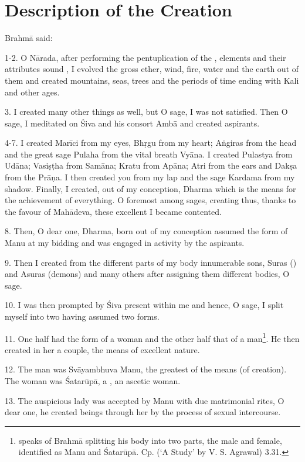 \chapter{Description of the Creation}

Brahmā said:

1-2. O Nārada, after performing the pentuplication of the , elements
and their attributes sound \etc, I evolved the gross ether, wind, fire, water
and the earth out of them and created mountains, seas, trees \etc and
the periods of time ending with Kali and other ages.

3. I created many other things as well, but O sage, I was not satisfied. Then
O sage, I meditated on Śiva and his consort Ambā and created aspirants.

4-7. I created Marīci from my eyes, Bhṛgu from my heart; Aṅgiras from the head
and the great sage Pulaha from the vital breath Vyāna. I created Pulastya from
Udāna; Vasiṣṭha from Samāna; Kratu from Apāna; Atri from the ears and Dakṣa from
the Prāṇa. I then created you from my lap and the sage Kardama from my shadow.
Finally, I created, out of my conception, Dharma which is the means for
the achievement of everything. O foremost among sages, creating thus, thanks to
the favour of Mahādeva, these excellent  I became contented.

8. Then, O dear one, Dharma, born out of my conception assumed the form of Manu
at my bidding and was engaged in activity by the aspirants.

9. Then I created from the different parts of my body innumerable sons, Suras
() and Asuras (demons) and many others after assigning them different
bodies, O sage.

10. I was then prompted by Śiva present within me and hence, O sage, I split
myself into two having assumed two forms.

11. One half had the form of a woman and the other half that of a man\footnote{
 speaks of Brahmā splitting his body into two parts, the male
and female, identified as Manu and Śatarūpā. Cp.  (‘A Study’
by V. S. Agrawal) 3.31.}. He then created in her a couple, the means of
excellent nature.

12. The man was Svāyambhuva Manu, the greatest of the means (of creation).
The woman was Śatarūpā, a , an ascetic woman.

13. The auspicious lady was accepted by Manu with due matrimonial rites, O dear
one, he created beings through her by the process of sexual intercourse.

